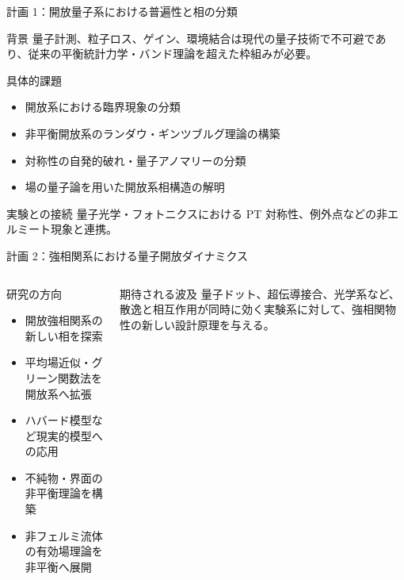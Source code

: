 \documentclass[aspectratio=169,11pt]{beamer}
\begin{document}
\begin{frame}{計画 1：開放量子系における普遍性と相の分類}
\begin{block}{背景}
量子計測、粒子ロス、ゲイン、環境結合は現代の量子技術で不可避であり、従来の平衡統計力学・バンド理論を超えた枠組みが必要。
\end{block}
\begin{block}{具体的課題}
\begin{itemize}
  \item 開放系における臨界現象の分類
  \item 非平衡開放系のランダウ・ギンツブルグ理論の構築
  \item 対称性の自発的破れ・量子アノマリーの分類
  \item 場の量子論を用いた開放系相構造の解明
\end{itemize}
\end{block}
\begin{alertblock}{実験との接続}
量子光学・フォトニクスにおける PT 対称性、例外点などの非エルミート現象と連携。
\end{alertblock}
\end{frame}

\begin{frame}{計画 2：強相関系における量子開放ダイナミクス}
\begin{columns}[T]
\begin{block}{研究の方向}
\begin{itemize}
  \item 開放強相関系の新しい相を探索
  \item 平均場近似・グリーン関数法を開放系へ拡張
  \item ハバード模型など現実的模型への応用
  \item 不純物・界面の非平衡理論を構築
  \item 非フェルミ流体の有効場理論を非平衡へ展開
\end{itemize}
\end{block}
\begin{block}{期待される波及}
量子ドット、超伝導接合、光学系など、散逸と相互作用が同時に効く実験系に対して、強相関物性の新しい設計原理を与える。
\end{block}
\end{columns}
\end{frame}
\end{document}
